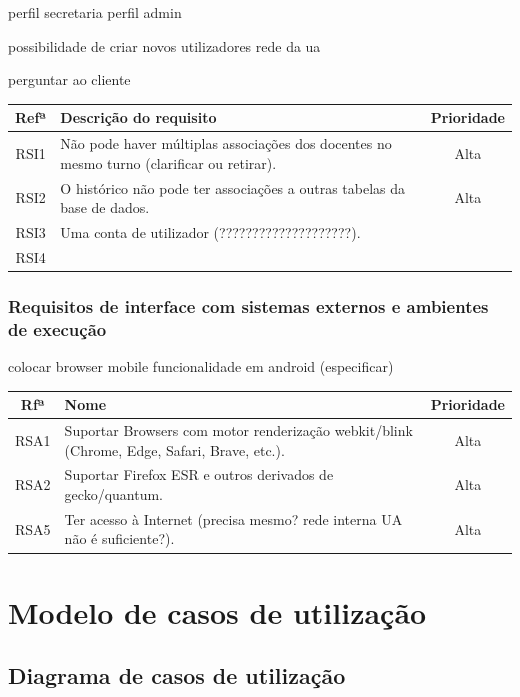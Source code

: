 \documentclass[11pt, twoside]{report}
\begin{document}
	perfil secretaria 
	perfil admin
	
	possibilidade de criar novos utilizadores
	rede da ua
	
	perguntar ao cliente
	\begin{center}	
	\begin{tabularx}{\textwidth}{|c|X|c|}
		\hline
		\textbf{Refª }	& \textbf{Descrição do requisito} & \textbf{Prioridade} \\
		\hline
		RSI1 & Não pode haver múltiplas associações dos docentes no mesmo turno (clarificar ou retirar). & Alta\\
		\hline
		RSI2 & O histórico não pode ter associações a outras tabelas da base de dados. & Alta\\
		\hline
		RSI3 & Uma conta de utilizador (????????????????????). & \\
		\hline
		RSI4 & & \\
		\hline
	\end{tabularx}
	\label{requisitosdeseguranca}
\end{center}
	
	\subsection{Requisitos de interface com sistemas externos e ambientes de execução}
	
	colocar browser mobile
	funcionalidade em android (especificar)
	
		\begin{center}
		\begin{tabularx}{\textwidth}{|c|X|c|}
			\hline
			Rfª & Nome & Prioridade \\
			\hline
			RSA1 & Suportar Browsers com motor renderização webkit/blink (Chrome, Edge, Safari, Brave, etc.).  & Alta \\
			\hline
			RSA2 & Suportar Firefox ESR e outros derivados de gecko/quantum. & Alta \\
			\hline
			RSA5 & Ter acesso à Internet (precisa mesmo? rede interna UA não é suficiente?). & Alta\\
			\hline
		\end{tabularx}
		\label{requisitosdesistemas}
	\end{center}
	
	\chapter{Modelo de casos de utilização}
	\section{Diagrama de casos de utilização}
\end{document}
